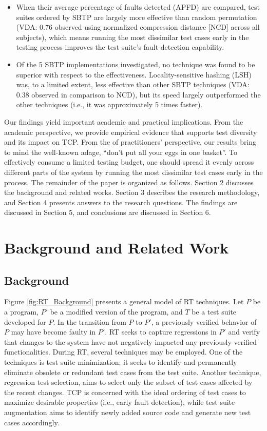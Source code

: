 \documentclass[runningheads]{llncs}
\begin{document}
\begin{itemize}
\item When their average percentage of faults detected (APFD) are compared, test suites ordered by SBTP are largely more effective than random permutation (VDA: 0.76 observed using normalized compression distance [NCD] across all subjects), which means running the most dissimilar test cases early in the testing process improves the test suite's fault-detection capability.
\item Of the 5 SBTP implementations investigated, no technique was found to be superior with respect to the effectiveness. Locality-sensitive hashing (LSH) was, to a limited extent, less effective than other SBTP techniques (VDA: 0.38 observed in comparison to NCD), but its speed largely outperformed the other techniques (i.e., it was approximately 5 times faster).

\end{itemize}

Our findings yield important academic and practical implications. From the academic perspective, we provide empirical evidence that supports test diversity and its impact on TCP. From the of practitioners’ perspective, our results bring to mind the well-known adage, \enquote{don't put all your eggs in one basket}. To effectively consume a limited testing budget, one should spread it evenly across different parts of the system by running the most dissimilar test cases early in the process. The remainder of the paper is organized as follows. Section 2 discusses the background and related works. Section 3 describes the research methodology, and Section 4 presents answers to the research questions. The findings are discussed in Section 5, and conclusions are discussed in Section 6.


\section{Background and Related Work}
\subsection{Background}
Figure \ref{fig:RT_Background} presents a general model of RT techniques. Let $P$ be a program, $P'$ be a modified version of the program, and $T$ be a test suite developed for $P$. In the transition from $P$ to $P'$, a previously verified behavior of $P$ may have become faulty in $P'$. RT seeks to capture regressions in $P'$ and verify that changes to the system have not negatively impacted any previously verified functionalities. During RT, several techniques may be employed. One of the techniques is test suite minimization; it seeks to identify and permanently eliminate obsolete or redundant test cases from the test suite. Another technique, regression test selection, aims to select only the subset of test cases affected by the recent changes. TCP is concerned with the ideal ordering of test cases to maximize desirable properties (i.e., early fault detection), while test suite augmentation aims to identify newly added source code and generate new test cases accordingly.
\end{document}
